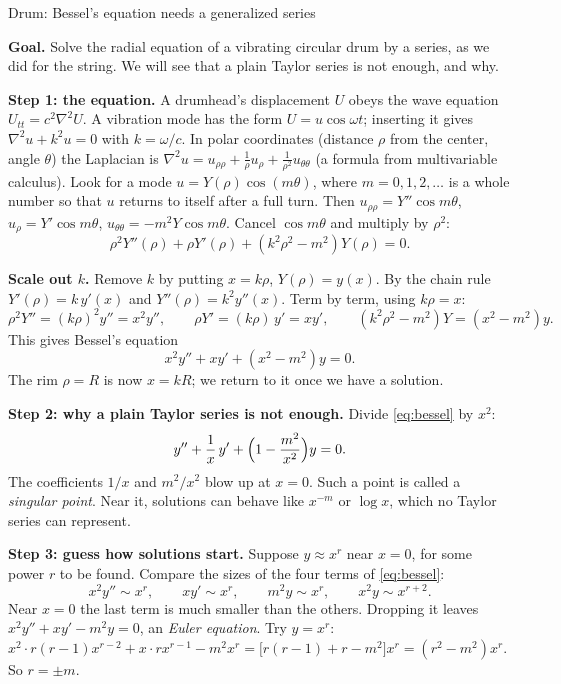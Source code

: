 \documentclass[11pt]{beamer}
\begin{document}
\begin{frame}[allowframebreaks=1.00]{Drum: Bessel's equation needs a generalized series}
\footnotesize

\textbf{Goal.} Solve the radial equation of a vibrating circular drum by a series, as we did for
the string. We will see that a plain Taylor series is not enough, and why.

\textbf{Step 1: the equation.} A drumhead's displacement \(U\) obeys the wave equation \(U_{tt}=c^2\nabla^2U\).
A vibration mode has the form \(U=u\cos\omega t\); inserting it gives \(\nabla^2u+k^2u=0\) with \(k=\omega/c\).
In polar coordinates (distance \(\rho\) from the center, angle \(\theta\)) the Laplacian is
\(\nabla^2u=u_{\rho\rho}+\frac1\rho u_\rho+\frac1{\rho^2}u_{\theta\theta}\) (a formula from multivariable
calculus). Look for a mode \(u=Y(\rho)\cos(m\theta)\), where \(m=0,1,2,\dots\) is a whole number so that \(u\) returns
to itself after a full turn. Then \(u_{\rho\rho}=Y''\cos m\theta\), \(u_\rho=Y'\cos m\theta\), \(u_{\theta\theta}=-m^2Y\cos m\theta\).
Cancel \(\cos m\theta\) and multiply by \(\rho^2\):
\[
 \rho^2Y''(\rho)+\rho Y'(\rho)+(k^2\rho^2-m^2)Y(\rho)=0.
\]


\textbf{Scale out \(k\).} Remove \(k\) by putting \(x=k\rho\), \(Y(\rho)=y(x)\). By the
chain rule \(Y'(\rho)=k\,y'(x)\) and \(Y''(\rho)=k^2y''(x)\). Term by term, using \(k\rho=x\):
\[
 \rho^2Y''=(k\rho)^2y''=x^2y'',\qquad \rho Y'=(k\rho)\,y'=xy',\qquad (k^2\rho^2-m^2)Y=(x^2-m^2)y .
\]
This gives Bessel's equation
\begin{equation}
 x^2y''+xy'+(x^2-m^2)y=0.\label{eq:bessel}
\end{equation}
The rim \(\rho=R\) is now \(x=kR\); we return to it once we have a solution.


\textbf{Step 2: why a plain Taylor series is not enough.} Divide \eqref{eq:bessel} by \(x^2\):
\[
 y''+\frac1x\,y'+\Bigl(1-\frac{m^2}{x^2}\Bigr)y=0 .
\]
The coefficients \(1/x\) and \(m^2/x^2\) blow up at \(x=0\). Such a point is called a \emph{singular point}.
Near it, solutions can behave like \(x^{-m}\) or \(\log x\), which no Taylor series can represent.

\textbf{Step 3: guess how solutions start.} Suppose \(y\approx x^r\) near \(x=0\), for some power \(r\) to be
found. Compare the sizes of the four terms of \eqref{eq:bessel}:
\[
 x^2y''\sim x^r,\qquad xy'\sim x^r,\qquad m^2y\sim x^r,\qquad x^2y\sim x^{r+2}.
\]
Near \(x=0\) the last term is much smaller than the others. Dropping it leaves
\(x^2y''+xy'-m^2y=0\), an \emph{Euler equation}. Try \(y=x^r\): \(x^2\cdot r(r-1)x^{r-2}+x\cdot rx^{r-1}-m^2x^r
=\bigl[r(r-1)+r-m^2\bigr]x^r=(r^2-m^2)x^r\). So \(r=\pm m\).


\end{frame}
\end{document}
